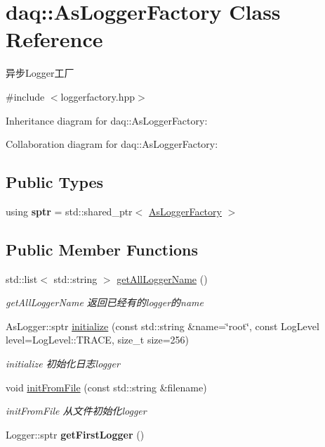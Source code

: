 \hypertarget{classdaq_1_1AsLoggerFactory}{}\section{daq\+:\+:As\+Logger\+Factory Class Reference}
\label{classdaq_1_1AsLoggerFactory}


异步\+Logger工厂  




{\ttfamily \#include $<$loggerfactory.\+hpp$>$}



Inheritance diagram for daq\+:\+:As\+Logger\+Factory\+:


Collaboration diagram for daq\+:\+:As\+Logger\+Factory\+:
\subsection*{Public Types}
\begin{DoxyCompactItemize}
\item 
\mbox{\label{classdaq_1_1AsLoggerFactory_abadf4bd3d6de89d119b1fcdb30147100}} 
using {\bfseries sptr} = std\+::shared\+\_\+ptr$<$ \hyperlink{classdaq_1_1AsLoggerFactory}{As\+Logger\+Factory} $>$
\end{DoxyCompactItemize}
\subsection*{Public Member Functions}
\begin{DoxyCompactItemize}
\item 
std\+::list$<$ std\+::string $>$ \hyperlink{classdaq_1_1AsLoggerFactory_aa25c05ec2b0c3f459b17e8cf602e40cb}{get\+All\+Logger\+Name} ()
\begin{DoxyCompactList}\small\item\em get\+All\+Logger\+Name 返回已经有的logger的name \end{DoxyCompactList}\item 
As\+Logger\+::sptr \hyperlink{classdaq_1_1AsLoggerFactory_a58bca4ebd889f5854cf3fff7cae8b661}{initialize} (const std\+::string \&name=\char`\"{}root\char`\"{}, const Log\+Level level=Log\+Level\+::\+T\+R\+A\+CE, size\+\_\+t size=256)
\begin{DoxyCompactList}\small\item\em initialize 初始化日志logger \end{DoxyCompactList}\item 
void \hyperlink{classdaq_1_1AsLoggerFactory_aed827f37657c287c120cddce8868256b}{init\+From\+File} (const std\+::string \&filename)
\begin{DoxyCompactList}\small\item\em init\+From\+File 从文件初始化logger \end{DoxyCompactList}\item 
\mbox{\label{classdaq_1_1AsLoggerFactory_adb4043c8e856bfefed35df3f57642689}} 
Logger\+::sptr {\bfseries get\+First\+Logger} ()
\end{DoxyCompactItemize}
